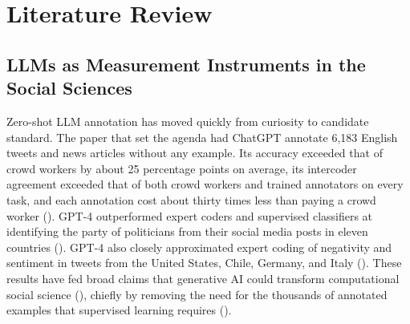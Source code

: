 \documentclass[
  man,
  floatsintext,
  longtable,
  nolmodern,
  notxfonts,
  notimes,
  colorlinks=true,linkcolor=blue,citecolor=blue,urlcolor=blue]{apa7}
\begin{document}
\section{Literature Review}\label{literature-review}

\subsection{LLMs as Measurement Instruments in the Social
Sciences}\label{llms-as-measurement-instruments-in-the-social-sciences}

Zero-shot LLM annotation has moved quickly from curiosity to candidate
standard. The paper that set the agenda had ChatGPT annotate 6,183
English tweets and news articles without any example. Its accuracy
exceeded that of crowd workers by about 25 percentage points on average,
its intercoder agreement exceeded that of both crowd workers and trained
annotators on every task, and each annotation cost about thirty times
less than paying a crowd worker
(). GPT-4 outperformed expert coders and supervised classifiers at
identifying the party of politicians from their social media posts in
eleven countries
(). GPT-4
also closely approximated expert coding of negativity and sentiment in
tweets from the United States, Chile, Germany, and Italy
(). These results have fed broad claims that generative
AI could transform computational social science
(), chiefly
by removing the need for the thousands of annotated examples that
supervised learning requires
().
\end{document}
